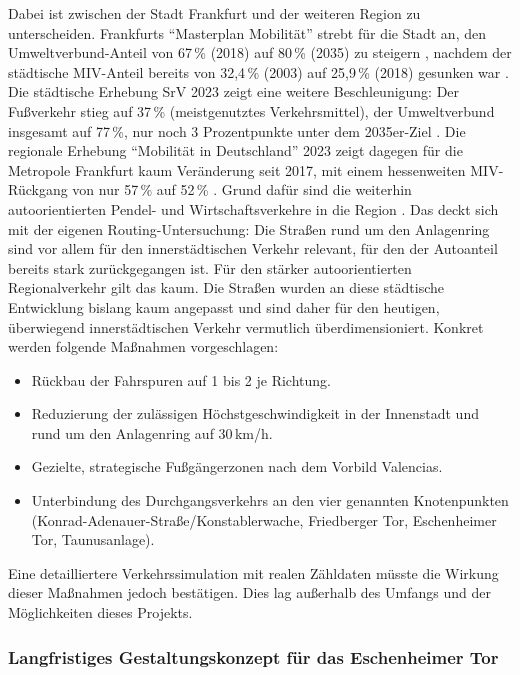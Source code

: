 \documentclass[a4paper,12pt]{article}
\begin{document}
Dabei ist zwischen der Stadt Frankfurt und der weiteren Region zu unterscheiden. Frankfurts \enquote{Masterplan Mobilität} strebt für die Stadt an, den Umweltverbund-Anteil von 67\,\% (2018) auf 80\,\% (2035) zu steigern \autocite{stadtfrankfurtmasterplan2025}, nachdem der städtische MIV-Anteil bereits von 32,4\,\% (2003) auf 25,9\,\% (2018) gesunken war \autocite{stadtfrankfurtmodalsplit2020}. Die städtische Erhebung SrV 2023 zeigt eine weitere Beschleunigung: Der Fußverkehr stieg auf 37\,\% (meistgenutztes Verkehrsmittel), der Umweltverbund insgesamt auf 77\,\%, nur noch 3 Prozentpunkte unter dem 2035er-Ziel \autocite{stadtfrankfurtsrv2025}. Die regionale Erhebung \enquote{Mobilität in Deutschland} 2023 zeigt dagegen für die Metropole Frankfurt kaum Veränderung seit 2017, mit einem hessenweiten MIV-Rückgang von nur 57\,\% auf 52\,\% \autocite{infasmid2025}. Grund dafür sind die weiterhin autoorientierten Pendel- und Wirtschaftsverkehre in die Region \autocite{stadtfrankfurtzieleverfahren2025}. Das deckt sich mit der eigenen Routing-Untersuchung: Die Straßen rund um den Anlagenring sind vor allem für den innerstädtischen Verkehr relevant, für den der Autoanteil bereits stark zurückgegangen ist. Für den stärker autoorientierten Regionalverkehr gilt das kaum. Die Straßen wurden an diese städtische Entwicklung bislang kaum angepasst und sind daher für den heutigen, überwiegend innerstädtischen Verkehr vermutlich überdimensioniert.
\FloatBarrier
Konkret werden folgende Maßnahmen vorgeschlagen:

\begin{itemize}
	\item Rückbau der Fahrspuren auf 1 bis 2 je Richtung.
	\item Reduzierung der zulässigen Höchstgeschwindigkeit in der Innenstadt und rund um den Anlagenring auf 30\,km/h.
	\item Gezielte, strategische Fußgängerzonen nach dem Vorbild Valencias.
	\item Unterbindung des Durchgangsverkehrs an den vier genannten Knotenpunkten (Konrad-Adenauer-Straße/Konstablerwache, Friedberger Tor, Eschenheimer Tor, Taunusanlage).
\end{itemize}

Eine detailliertere Verkehrssimulation mit realen Zähldaten müsste die Wirkung dieser Maßnahmen jedoch bestätigen. Dies lag außerhalb des Umfangs und der Möglichkeiten dieses Projekts.

\FloatBarrier
\subsubsection{Langfristiges Gestaltungskonzept für das Eschenheimer Tor}
\end{document}
